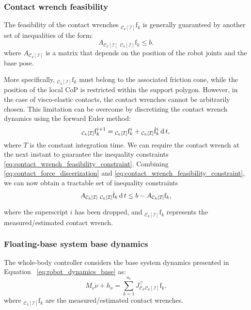 \subsubsection{Contact wrench feasibility}
The feasibility of the contact wrenches ${}_{\mathcal{C}_k[\mathcal{I}]}\mathrm{f}_k$ is generally guaranteed by another set of inequalities of the form:
\begin{equation}
    \label{eq:contact_wrench_feasibility_constraint}
    A_{\mathcal{C}_k[\mathcal{I}]} \; {}_{\mathcal{C}_k[\mathcal{I}]}\mathrm{f}_k \le b.
\end{equation}
where $A_{\mathcal{C}_k[\mathcal{I}]}$ is a matrix that depends on the position of the robot joints and the base pose.
\par
More specifically, ${}_{\mathcal{C}_k[\mathcal{I}]}\mathrm{f}_k$ must belong to the associated friction cone, while the position of the local CoP is restricted within the support polygon. However, in the case of visco-elastic contacts, the contact wrenches cannot be arbitrarily chosen. This limitation can be overcome by discretizing the contact wrench dynamics using the forward Euler method:
\begin{equation}
    \label{eq:contact_force_discerization}
    {}_{\mathcal{C}_k[\mathcal{I}]}\mathrm{f}_k^{i+1} = {}_{\mathcal{C}_k[\mathcal{I}]}\mathrm{f}_k^{i} + {}_{\mathcal{C}_k[\mathcal{I}]}\dot{\mathrm{f}}_k^i \operatorname{d} t,
\end{equation}
where $T$ is the constant integration time. 
We can require the contact wrench at the next instant to guarantee the inequality constraints \eqref{eq:contact_wrench_feasibility_constraint}.
Combining \eqref{eq:contact_force_discerization} and \eqref{eq:contact_wrench_feasibility_constraint}, we can now obtain a tractable set of inequality constraints
\begin{equation}
A_{\mathcal{C}_k[\mathcal{I}]}\; {}_{\mathcal{C}_k[\mathcal{I}]}\dot{\mathrm{f}}_k \operatorname{d} t  \le b -  A  {}_{\mathcal{C}_k[\mathcal{I}]}\mathrm{f}_k,    
\end{equation}
 
where the superscript $i$ has been dropped, and ${}_{\mathcal{C}_k[\mathcal{I}]}\mathrm{f}_k$ represents the measured/estimated contact wrench.
\subsubsection{Floating-base system base dynamics}
The whole-body controller considers the base system dynamics presented in Equation~ \eqref{eq:robot_dynamics_base} as:
\begin{equation}
    \label{eq:base_dynamics_compliant}
    M_\nu \dot{\nu} + h_\nu = \sum_{k = 1}^{n_c} J^\top_{\mathcal{C}_k} {}_{\mathcal{C}_k[\mathcal{I}]}{\mathrm{f}}_k.
\end{equation}
where ${}_{\mathcal{C}_k[\mathcal{I}]}\mathrm{f}_k$ are the measured/estimated contact wrenches. 
